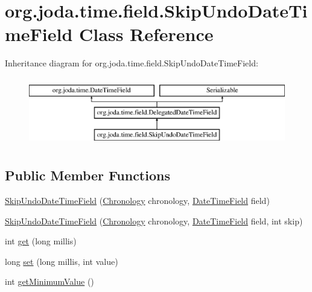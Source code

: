 \hypertarget{classorg_1_1joda_1_1time_1_1field_1_1_skip_undo_date_time_field}{\section{org.\-joda.\-time.\-field.\-Skip\-Undo\-Date\-Time\-Field Class Reference}
\label{classorg_1_1joda_1_1time_1_1field_1_1_skip_undo_date_time_field}
}
Inheritance diagram for org.\-joda.\-time.\-field.\-Skip\-Undo\-Date\-Time\-Field\-:\begin{figure}[H]
\begin{center}
\leavevmode
\includegraphics[height=3.000000cm]{classorg_1_1joda_1_1time_1_1field_1_1_skip_undo_date_time_field}
\end{center}
\end{figure}
\subsection*{Public Member Functions}
\begin{DoxyCompactItemize}
\item 
\hyperlink{classorg_1_1joda_1_1time_1_1field_1_1_skip_undo_date_time_field_a4c319e2de4b8354821d867c6397fdebc}{Skip\-Undo\-Date\-Time\-Field} (\hyperlink{classorg_1_1joda_1_1time_1_1_chronology}{Chronology} chronology, \hyperlink{classorg_1_1joda_1_1time_1_1_date_time_field}{Date\-Time\-Field} field)
\item 
\hyperlink{classorg_1_1joda_1_1time_1_1field_1_1_skip_undo_date_time_field_a538362f383d6c1a608829affeceabc2b}{Skip\-Undo\-Date\-Time\-Field} (\hyperlink{classorg_1_1joda_1_1time_1_1_chronology}{Chronology} chronology, \hyperlink{classorg_1_1joda_1_1time_1_1_date_time_field}{Date\-Time\-Field} field, int skip)
\item 
int \hyperlink{classorg_1_1joda_1_1time_1_1field_1_1_skip_undo_date_time_field_a90e9ad6ff0be34bd392cf416a5c8166a}{get} (long millis)
\item 
long \hyperlink{classorg_1_1joda_1_1time_1_1field_1_1_skip_undo_date_time_field_ab349f12255fdf7f7d904066eb3267b7e}{set} (long millis, int value)
\item 
int \hyperlink{classorg_1_1joda_1_1time_1_1field_1_1_skip_undo_date_time_field_a4231ae80558a992f5f3f6e7a5cc34389}{get\-Minimum\-Value} ()
\end{DoxyCompactItemize}



